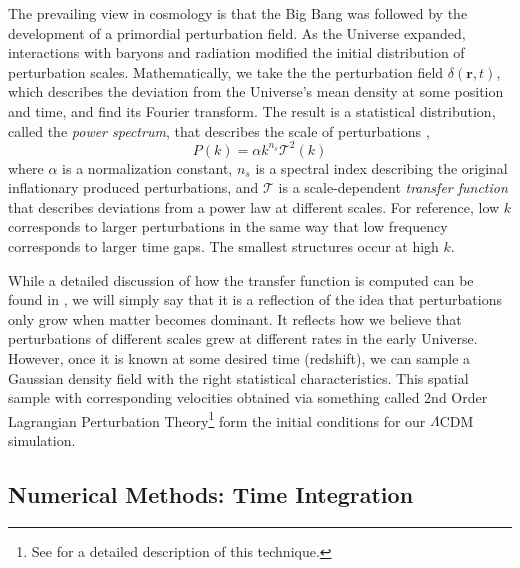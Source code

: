 The prevailing view in cosmology is that the Big Bang was followed by the development of a primordial perturbation field. As the Universe expanded, interactions with baryons and radiation modified the initial distribution of perturbation scales. Mathematically, we take the the perturbation field $\delta(\textbf{r}, t)$, which describes the deviation from the Universe's mean density at some position and time, and find its Fourier transform. The result is a statistical distribution, called the \textit{power spectrum}, that describes the scale of perturbations \citep{music},
\begin{equation}
P(k) = \alpha k^{n_s} \mathcal{T}^2(k)
\end{equation}
where $\alpha$ is a normalization constant, $n_s$ is a spectral index describing the original inflationary produced perturbations, and $\mathcal{T}$ is a scale-dependent \textit{transfer function} that describes deviations from a power law at different scales. For reference, low $k$ corresponds to larger perturbations in the same way that low frequency corresponds to larger time gaps. The smallest structures occur at high $k$.  

While a detailed discussion of how the transfer function is computed can be found in \citet{music}, we will simply say that it is a reflection of the idea that perturbations only grow when matter becomes dominant. It reflects how we believe that perturbations of different scales grew at different rates in the early Universe. However, once it is known at some desired time (redshift), we can sample a Gaussian density field with the right statistical characteristics. This spatial sample with corresponding velocities obtained via something called 2nd Order Lagrangian Perturbation Theory\footnote{See \citet{music} for a detailed description of this technique.} form the initial conditions for our $\Lambda$CDM simulation.

\subsection{Numerical Methods: Time Integration}

